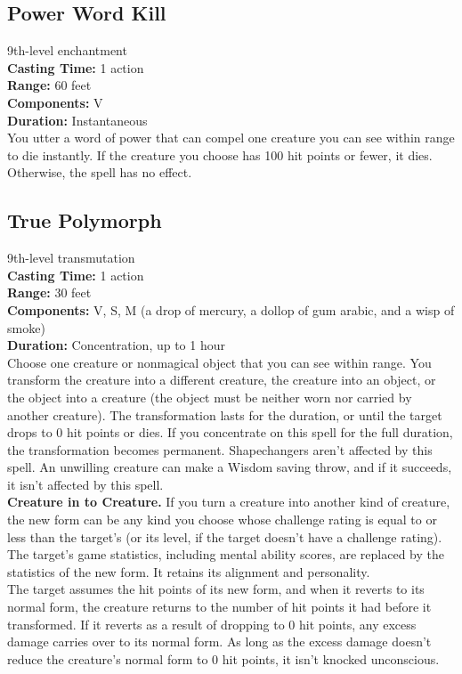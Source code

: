 \documentclass[11pt, A4paper, english]{article}
\begin{document}
		\subsection{Power Word Kill}
9th-level enchantment \\
\textbf{Casting Time:} 1 action \\
\textbf{Range:} 60 feet \\
\textbf{Components:} V \\
\textbf{Duration:} Instantaneous \\
You utter a word of power that can compel one creature you can see within range to die instantly. If the creature you choose has 100 hit points or fewer, it dies. Otherwise, the spell has no effect.

		\subsection{True Polymorph}
9th-level transmutation \\
\textbf{Casting Time:} 1 action \\
\textbf{Range:} 30 feet \\
\textbf{Components:} V, S, M (a drop of mercury, a dollop of gum arabic, and a wisp of smoke) \\
\textbf{Duration:} Concentration, up to 1 hour \\
Choose one creature or nonmagical object that you can see within range. You transform the creature into a different creature, the creature into an object, or the object into a creature (the object must be neither worn nor carried by another creature). The transformation lasts for the duration, or until the target drops to 0 hit points or dies. If you concentrate on this spell for the full duration, the transformation becomes permanent. Shapechangers aren’t affected by this spell. An unwilling creature can make a Wisdom saving throw, and if it succeeds, it isn’t affected by this spell. \\
\textbf{Creature in to Creature.} If you turn a creature into another kind of creature, the new form can be any kind you choose whose challenge rating is equal to or less than the target’s (or its level, if the target doesn’t have a challenge rating). The target’s game statistics, including mental ability scores, are replaced by the statistics of the new form. It retains its alignment and personality. \\
The target assumes the hit points of its new form, and when it reverts to its normal form, the creature returns to the number of hit points it had before it transformed. If it reverts as a result of dropping to 0 hit points, any excess damage carries over to its normal form. As long as the excess damage doesn’t reduce the creature’s normal form to 0 hit points, it isn’t knocked unconscious. \\
\end{document}
